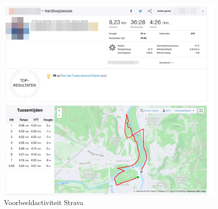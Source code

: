 \begin{figure}
    \centering
    \includegraphics[width=0.5\linewidth]{fig/VoorbeeldActiviteiten/VoorbeeldActiviteit_Cropped.png}
    \caption{Voorbeeldactiviteit Strava}\label{fig:activityExample}
\end{figure}

